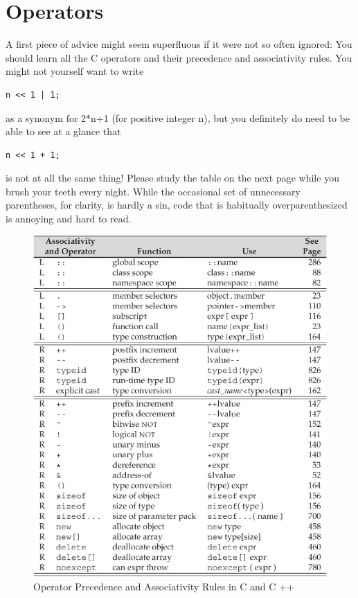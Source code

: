\documentclass[12pt]{report}
\begin{document}
\section{Operators}

A first piece of advice might seem superfluous if it were not so often ignored:
You should learn all the C operators and their precedence and associativity rules.
You might not yourself want to write

\begin{lstlisting}[style=CStyle]
   n << 1 | 1; 
\end{lstlisting}

as a synonym for 2*n+1 (for positive integer n), but you definitely do need to be able
to see at a glance that
\begin{lstlisting}[style=CStyle]
   n << 1 + 1; 
\end{lstlisting}

is not at all the same thing! Please study the table on the next page while you brush
your teeth every night. While the occasional set of unnecessary parentheses, for
clarity, is hardly a sin, code that is habitually overparenthesized is annoying and hard
to read.
\begin{figure}[!htbp]
	\centering
	\includegraphics[width=1.\linewidth]{operators.jpg}
	\caption{Operator Precedence and Associativity Rules in C and C ++}
	\label{fig:operatorccpp}
\end{figure}
\end{document}
